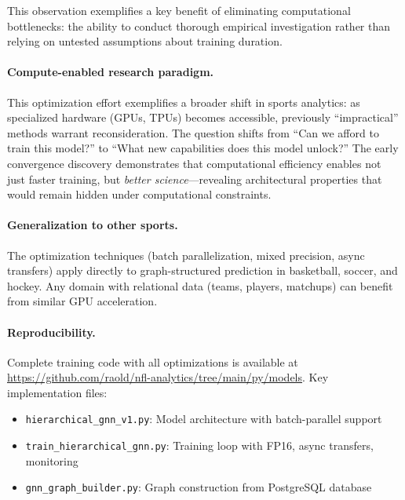 This observation exemplifies a key benefit of eliminating computational bottlenecks: the ability to conduct thorough empirical investigation rather than relying on untested assumptions about training duration.

\paragraph{Compute-enabled research paradigm.} This optimization effort exemplifies a broader shift in sports analytics: as specialized hardware (GPUs, TPUs) becomes accessible, previously ``impractical'' methods warrant reconsideration. The question shifts from ``Can we afford to train this model?'' to ``What new capabilities does this model unlock?'' The early convergence discovery demonstrates that computational efficiency enables not just faster training, but \textit{better science}—revealing architectural properties that would remain hidden under computational constraints.

\paragraph{Generalization to other sports.} The optimization techniques (batch parallelization, mixed precision, async transfers) apply directly to graph-structured prediction in basketball, soccer, and hockey. Any domain with relational data (teams, players, matchups) can benefit from similar GPU acceleration.

\paragraph{Reproducibility.} Complete training code with all optimizations is available at \url{https://github.com/raold/nfl-analytics/tree/main/py/models}. Key implementation files:
\begin{itemize}
    \item \texttt{hierarchical\_gnn\_v1.py}: Model architecture with batch-parallel support
    \item \texttt{train\_hierarchical\_gnn.py}: Training loop with FP16, async transfers, monitoring
    \item \texttt{gnn\_graph\_builder.py}: Graph construction from PostgreSQL database
\end{itemize}

